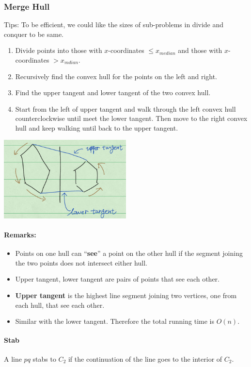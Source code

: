 \subsubsection{Merge Hull}
Tips: To be efficient, we could like the sizes of sub-problems in divide and 
conquer to be same.
\begin{enumerate}
 \item Divide points into those with $x$-coordinates $\le x_{median}$ and those 
with $x$-coordinates $> x_{mdian}$.
\item Recursively find the convex hull for the points on the left and right.
\item Find the upper tangent and lower tangent of the two convex hull. 
\item Start from the left of upper tangent and walk through the left convex 
hull counterclockwise until meet the lower tangent. Then move to the right 
convex hull and keep walking until back to the upper tangent.
\end{enumerate}
\centerline{\includegraphics[width=0.5\textwidth]{tangent.png}}

\paragraph{Remarks:}
\begin{itemize}
\item Points on one hull can ``\textbf{see}'' a point on the other hull if the 
segment joining the two points does not intersect either hull.
\item Upper tangent, lower tangent are pairs of points that see each other.
\item \textbf{Upper tangent}  is the highest line segment joining two vertices, 
one from each hull, that see each other.
\item Similar with the lower tangent. Therefore the total running time is 
$O(n)$.
\end{itemize}

\paragraph{Stab}
A line $pq$ stabs to $C_2$ if the continuation of the line goes to 
the interior of $C_2$.

